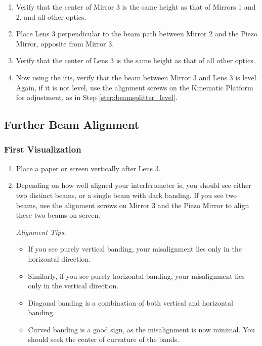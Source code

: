 \begin{enumerate}
\begin{enumerate}
        \item Verify that the center of Mirror 3 is the same height as that of
        Mirrors 1 and 2, and all other optics.
        \item Place Lens 3 perpendicular to the beam path between Mirror 2 and
        the Piezo Mirror, opposite from Mirror 3. 
        \item Verify that the center of Lens 3 is the same height as that of all
        other optics.
        \item Now using the iris, verify that the beam between Mirror 3 and Lens
        3 is level. Again, if it is not level, use the alignment screws on the
        Kinematic Platform for adjustment, as in Step
        \ref{step:beamsplitter_level}.  
        \end{enumerate}
    \end{enumerate}
        
\subsection{Further Beam Alignment}
\label{sub:further}

    \subsubsection{First Visualization}
        \begin{enumerate}
        \item Place a paper or screen vertically after Lens 3.
        \item Depending on how well aligned your interferometer is, you should
        see either two distinct beams, or a single beam with dark banding. If
        you see two beams, use the alignment screws on Mirror 3 and the Piezo
        Mirror to align these two beams on screen.

            \emph{Alignment Tips}:
            \begin{itemize}
            \item If you see purely vertical banding, your misalignment lies
            only in the horizontal direction.
            \item Similarly, if you see purely horizontal banding, your
            misalignment lies only in the vertical direction.
            \item Diagonal banding is a combination of both vertical and
            horizontal banding.
            \item Curved banding is a good sign, as the misalignment is now
            minimal.  You should seek the center of curvature of the bands.
            \end{itemize}
        \end{enumerate} 

